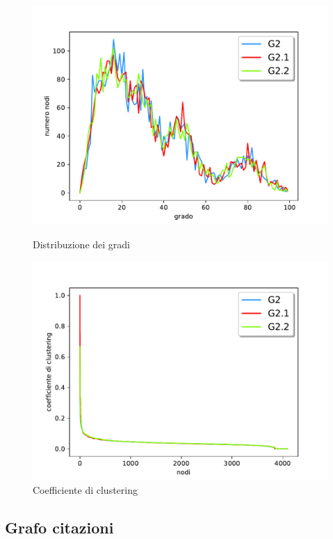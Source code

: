 \documentclass[12pt]{scrartcl}
\begin{document}
\begin{figure}[H]
	\centering
	\begin{minipage}{.5\textwidth}
		  \centering
		  \includegraphics[width=1\linewidth]{imgs/Figure_4.pdf}
		  \caption{Distribuzione dei gradi}\label{fig:fig4}
	\end{minipage}%
	\begin{minipage}{.5\textwidth}
		  \centering
		  \includegraphics[width=1\linewidth]{imgs/Figure_5.pdf}
		  \caption{Coefficiente di clustering}\label{fig:fig5}
	\end{minipage}
\end{figure}


\subsection{Grafo citazioni}
\end{document}

